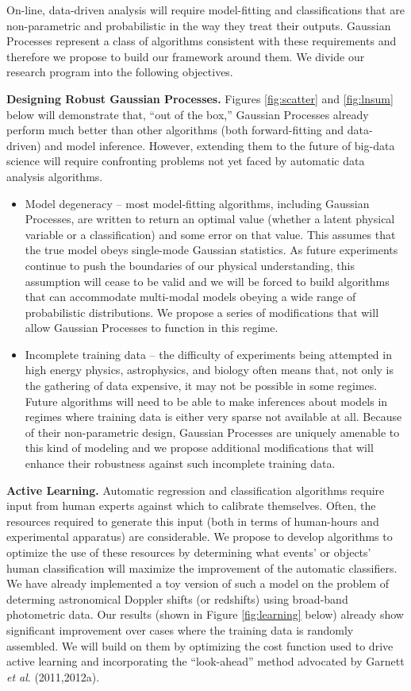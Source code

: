 \documentclass[useAMS,usenatbib,tightenlines,11pt,preprint]{aastex}
\begin{document}
On-line, data-driven analysis will require model-fitting and classifications
that are non-parametric and probabilistic in the way they treat their outputs.
Gaussian Processes represent a class of algorithms consistent with these
requirements and therefore we propose to build our framework around them.
We divide our research program into the following objectives.

{\bf Designing Robust Gaussian Processes.}  Figures \ref{fig:scatter}
and \ref{fig:lnsum} below will demonstrate that, ``out of the box,'' Gaussian
Processes already perform much better than other algorithms (both
forward-fitting and data-driven) and model inference.  However, extending them
to the future of big-data science will require confronting problems not yet
faced by automatic data analysis algorithms.
\begin{itemize}
\item Model degeneracy -- most model-fitting algorithms, including Gaussian
Processes, are written to return an optimal value (whether a latent physical
variable or a classification) and some error on that value.  This assumes that
the true model obeys single-mode Gaussian statistics.  As future experiments
continue to push the boundaries of our physical understanding, this assumption
will cease to be valid and we will be forced to build algorithms that can
accommodate multi-modal models obeying a wide range of probabilistic
distributions.  We propose a series of modifications that will allow Gaussian
Processes to function in this regime.

\item Incomplete training data -- the difficulty of experiments being attempted
in high energy physics, astrophysics, and biology often means that, not only is
the gathering of data expensive, it may not be possible in some regimes.  Future
algorithms will need to be able to make inferences about models in regimes where
training data is either very sparse not available at all.  Because of their
non-parametric design, Gaussian Processes are uniquely amenable to this kind of
modeling and we propose additional modifications that will enhance their
robustness against such incomplete training data.
\end{itemize}

{\bf Active Learning.} Automatic regression and classification
algorithms require input from human experts against which to calibrate
themselves.  Often, the resources required to generate this input
(both in terms of human-hours and experimental apparatus) are
considerable.  We propose to develop algorithms to optimize the use of
these resources by determining what events' or objects' human
classification will maximize the improvement of the automatic
classifiers.  We have already implemented a toy version of such a
model on the problem of determing astronomical Doppler shifts (or
redshifts) using broad-band photometric data.  Our results (shown in
Figure \ref{fig:learning} below) already show significant improvement over cases
where the training data is randomly assembled.  We will build on them by
optimizing the cost function used to drive active learning and incorporating the
``look-ahead'' method advocated by Garnett {\it et al}. (2011,2012a).
\end{document}
